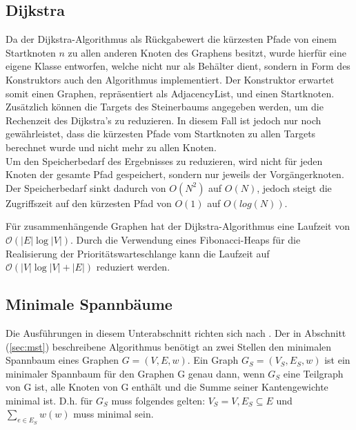 \documentclass[a4paper,10pt]{article}
\begin{document}
\subsection{Dijkstra}
Da der Dijkstra-Algorithmus als Rückgabewert die kürzesten Pfade von einem Startknoten $n$ zu allen anderen Knoten des Graphens besitzt,
wurde hierfür eine eigene Klasse entworfen, welche nicht nur als Behälter dient, sondern in Form des Konstruktors auch den Algorithmus implementiert.
Der Konstruktor erwartet somit einen Graphen, repräsentiert als AdjacencyList, und einen Startknoten. Zusätzlich können die Targets des Steinerbaums
angegeben werden, um die Rechenzeit des Dijkstra's zu reduzieren. In diesem Fall ist jedoch nur noch gewährleistet, dass die kürzesten Pfade vom Startknoten
zu allen Targets berechnet wurde und nicht mehr zu allen Knoten.\\
Um den Speicherbedarf des Ergebnisses zu reduzieren, wird nicht für jeden Knoten der gesamte Pfad gespeichert, sondern nur jeweils der Vorgängerknoten.
Der Speicherbedarf sinkt dadurch von $O(N^2)$ auf $O(N)$, jedoch steigt die Zugriffszeit auf den kürzesten Pfad von $O(1)$ auf $O(log(N))$.

Für zusammenhängende Graphen hat der Dijkstra-Algorithmus eine Laufzeit von $\mathcal{O}(|E|\log|V|)$. Durch die Verwendung eines Fibonacci-Heaps
für die Realisierung der Prioritätswarteschlange kann die Laufzeit auf $\mathcal{O}(|V|\log|V| + |E|)$ reduziert werden.



\subsection{Minimale Spannbäume}
Die Ausführungen in diesem Unterabschnitt richten sich nach \cite[Kapitel 23]{cormen}.
Der in Abschnitt (\ref{sec:mst}) beschreibene Algorithmus benötigt an zwei Stellen den minimalen Spannbaum eines Graphen $G=(V,E,w)$. Ein Graph
$G_S=(V_S,E_S,w)$ ist ein minimaler Spannbaum für den Graphen G genau dann, wenn $G_S$ eine Teilgraph von G ist, alle Knoten von G enthält und die Summe
seiner Kantengewichte minimal ist. D.h. für $G_S$ muss folgendes gelten: $V_S=V, E_S \subseteq E$ und $\sum_{e \in E_S} w(w)$ muss minimal sein.
\end{document}
